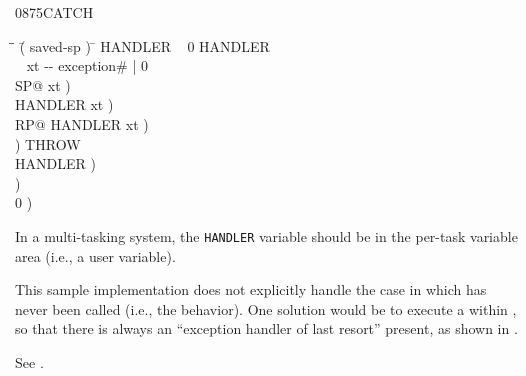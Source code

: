 \begin{worddef}{0875}{CATCH}
\begin{implement}
		\ttfamily
		\begin{tabbing}
		\tab \= \tab \= \hspace{7em} \= ( saved-sp ) \= \kill
		 HANDLER ~ 0 HANDLER \word{!} ~   \\[\parskip]

		\+ \word{:}  ~  xt -{}- exception\# | 0    \\
			SP@ 					\>\>  xt )\>   \\
			HANDLER  		\>\>  xt )\>   \\
			RP@ HANDLER \word{!}			\>\>  xt )\>   \\
								\>\>  )	  \>   THROW \\
			 HANDLER \word{!}	\>\>  )   \>   \\
			 		\>\>  )   \>   \\
										\>\>  0 ) \>   \\
		\word{;}
		\end{tabbing}

		\dffamily
		In a multi-tasking system, the \texttt{HANDLER} variable should be in
		the per-task variable area (i.e., a user variable).

		This sample implementation does not explicitly handle the case in
		which  has never been called (i.e., the 
		behavior). One solution would be to execute a  within
		, so that there is always an ``exception handler of last
		resort'' present, as shown in .
	\end{implement}

	\begin{testing}
		See .
	\end{testing}
\end{worddef}


